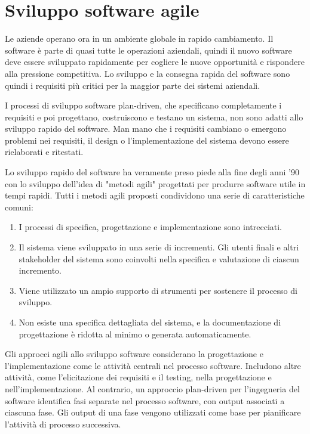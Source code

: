 \chapter{Sviluppo software agile}
Le aziende operano ora in un ambiente globale in rapido cambiamento. Il software è parte di quasi tutte le operazioni aziendali, quindi il nuovo software deve essere sviluppato rapidamente per cogliere le nuove opportunità e rispondere alla pressione competitiva. Lo sviluppo e la consegna rapida del software sono quindi i requisiti più critici per la maggior parte dei sistemi aziendali.

I processi di sviluppo software plan-driven, che specificano completamente i requisiti e poi progettano, costruiscono e testano un sistema, non sono adatti allo sviluppo rapido del software. Man mano che i requisiti cambiano o emergono problemi nei requisiti, il design o l'implementazione del sistema devono essere rielaborati e ritestati.

Lo sviluppo rapido del software ha veramente preso piede alla fine degli anni '90 con lo sviluppo dell'idea di "metodi agili" progettati per produrre software utile in tempi rapidi. Tutti i metodi agili proposti condividono una serie di caratteristiche comuni:
\begin{enumerate}
    \item I processi di specifica, progettazione e implementazione sono intrecciati.
    \item Il sistema viene sviluppato in una serie di incrementi. Gli utenti finali e altri stakeholder del sistema sono coinvolti nella specifica e valutazione di ciascun incremento.
    \item Viene utilizzato un ampio supporto di strumenti per sostenere il processo di sviluppo.
    \item Non esiste una specifica dettagliata del sistema, e la documentazione di progettazione è ridotta al minimo o generata automaticamente.
\end{enumerate}
Gli approcci agili allo sviluppo software considerano la progettazione e l'implementazione come le attività centrali nel processo software. Includono altre attività, come l'elicitazione dei requisiti e il testing, nella progettazione e nell'implementazione. Al contrario, un approccio plan-driven per l'ingegneria del software identifica fasi separate nel processo software, con output associati a ciascuna fase. Gli output di una fase vengono utilizzati come base per pianificare l'attività di processo successiva.

